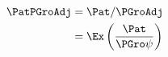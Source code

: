   \begin{equation}\begin{gathered}\begin{aligned}
    \PatPGroAdj  & = \Pat/\PGroAdj
    \\ & = \Ex\left(\frac{\Pat}{\PGro \psi}\right)  \label{eq:GPF}
  \end{aligned}\end{gathered}\end{equation}
